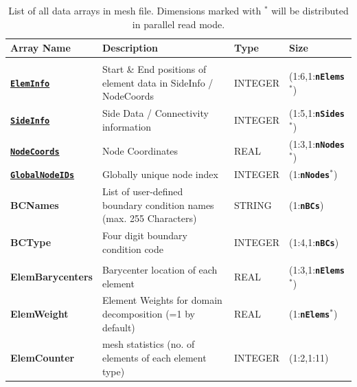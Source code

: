 \documentclass[a4paper,headsepline]{scrreprt}
\newcommand\ttbf[1]{\textbf{\texttt{#1}}}
\newcommand\ElemInfo{\hyperlink{ElemInfo}{\ttbf{ElemInfo}}}
\newcommand\SideInfo{\hyperlink{SideInfo}{\ttbf{SideInfo}}}
\newcommand\NodeCoords{\hyperlink{NodeInfo}{\ttbf{NodeCoords}}}
\newcommand\GlobalNodeIDs{\hyperlink{NodeInfo}{\ttbf{GlobalNodeIDs}}}
\newcommand\nElems{\ttbf{nElems}}
\newcommand\nSides{\ttbf{nSides}}
\newcommand\nNodes{\ttbf{nNodes}}
\newcommand\nBCs{\ttbf{nBCs}}
\begin{document}
\begin{table}[h!]
\centering
\begin{tabularx}{1.0\textwidth}{|>{\bfseries\ttfamily}l|X|l|l|} \hline
\normalfont \textbf{Array Name}  & \textbf{Description}                         & \textbf{Type} & \textbf{Size}        \\ \hline \hline
\multicolumn{4}{|l|}{\normalfont \textit{Main information:}} \\\hline
\ElemInfo        & Start \& End positions of element data in SideInfo / NodeCoords     & INTEGER & (1:6,1:\nElems$^*$) \\\hline
\SideInfo        & Side Data / Connectivity information                    & INTEGER   & (1:5,1:\nSides$^*$)           \\\hline
\NodeCoords      & Node Coordinates                                        & REAL      & (1:3,1:\nNodes$^*$)           \\\hline
\GlobalNodeIDs   & Globally unique node index                              & INTEGER   & (1:\nNodes$^*$)           \\\hline
BCNames         & List of user-defined boundary condition names (max. 255 Characters)& STRING    & (1:\nBCs)               \\\hline
BCType          & Four digit boundary condition code                      & INTEGER   & (1:4,1:\nBCs)             \\\hline
\multicolumn{4}{|l|}{\normalfont \textit{Additional information:}} \\\hline
ElemBarycenters & Barycenter location of each element                   & REAL      & (1:3,1:\nElems$^*$)           \\\hline
ElemWeight      & Element Weights for domain decomposition (=1 by default)& REAL      & (1:\nElems$^*$)             \\\hline
ElemCounter     & mesh statistics (no. of elements of each element type)  & INTEGER   & (1:2,1:11)           \\\hline
\end{tabularx}
\caption{List of all data arrays in mesh file. Dimensions marked with $^*$ will be distributed in parallel read mode. }
\end{table}


\clearpage
\end{document}
